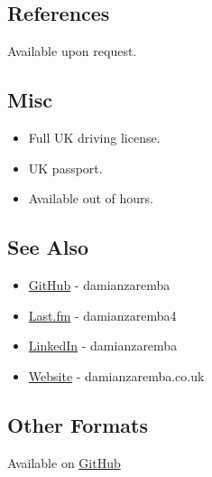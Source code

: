 \subsection{References}

Available upon request.

\subsection{Misc}

\begin{itemize}
\item
  Full UK driving license.
\item
  UK passport.
\item
  Available out of hours.
\end{itemize}

\subsection{See Also}

\begin{itemize}
\item
  \href{https://github.com/damianzaremba}{GitHub} - damianzaremba
\item
  \href{http://last.fm/user/damianzaremba4}{Last.fm} - damianzaremba4
\item
  \href{http://uk.linkedin.com/in/damianzaremba}{LinkedIn} -
  damianzaremba
\item
  \href{http://damianzaremba.co.uk}{Website} - damianzaremba.co.uk
\end{itemize}

\subsection{Other Formats}

Available on \href{https://github.com/DamianZaremba/cv}{GitHub}
